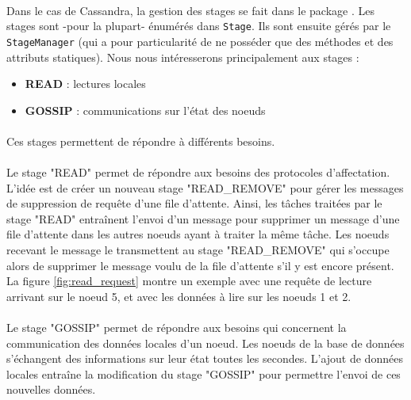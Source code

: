 \documentclass[12pt]{article}
\newcommand{\class}[1]{\texttt{#1}}
\begin{document}
\paragraph{} Dans le cas de Cassandra, la gestion des stages se fait dans le package . Les stages sont -pour la plupart- énumérés dans \class{Stage}. Ils sont ensuite gérés par le \class{StageManager} (qui a pour particularité de ne posséder que des méthodes et des attributs statiques). Nous nous intéresserons principalement aux stages :

\begin{itemize}
	\item \textbf{READ} : lectures locales
	\item \textbf{GOSSIP} : communications sur l'état des noeuds
\end{itemize}
\paragraph{} Ces stages permettent de répondre à différents besoins.

\paragraph{} Le stage "READ" permet de répondre aux besoins des protocoles d'affectation. L'idée est de créer un nouveau stage "READ\_REMOVE" pour gérer les messages de suppression de requête d'une file d'attente. Ainsi, les tâches traitées par le stage "READ" entraînent l'envoi d'un message pour supprimer un message d'une file d'attente dans les autres noeuds ayant à traiter la même tâche. Les noeuds recevant le message le transmettent au stage "READ\_REMOVE" qui s'occupe alors de supprimer le message voulu de la file d'attente s'il y est encore présent. La figure \ref{fig:read_request} montre un exemple avec une requête de lecture arrivant sur le noeud 5, et avec les données à lire sur les noeuds 1 et 2.

\paragraph{} Le stage "GOSSIP" permet de répondre aux besoins qui concernent la communication des données locales d'un noeud. Les noeuds de la base de données s'échangent des informations sur leur état toutes les secondes. L'ajout de données locales entraîne la modification du stage "GOSSIP" pour permettre l'envoi de ces nouvelles données.
\end{document}
